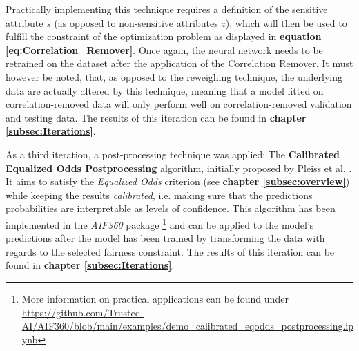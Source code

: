 Practically implementing this technique requires a definition of the sensitive attribute $s$ (as opposed to non-sensitive attributes $z$), which will then be used to fulfill the constraint of the optimization problem as displayed in \textbf{equation \ref{eq:Correlation_Remover}}. 
Once again, the neural network needs to be retrained on the dataset after the application of the Correlation Remover. It must however be noted, that, as opposed to the reweighing technique, the underlying data are actually altered by this technique, meaning that a model fitted on correlation-removed data will only perform well on correlation-removed validation and testing data. The results of this iteration can be found in \textbf{chapter \ref{subsec:Iterations}}.

As a third iteration, a post-processing technique was applied: The \textbf{Calibrated Equalized Odds Postprocessing} algorithm, initially proposed by Pleiss et al. \parencite{Pleiss2017}. It aims to satisfy the \textit{Equalized Odds} criterion (see \textbf{chapter \ref{subsec:overview}}) while keeping the results \textit{calibrated}, i.e. making sure that the predictions probabilities are interpretable as levels of confidence.
This algorithm has been implemented in the \textit{AIF360} package \footnote{More information on practical applications can be found under \url{https://github.com/Trusted-AI/AIF360/blob/main/examples/demo_calibrated_eqodds_postprocessing.ipynb}} and can be applied to the model's predictions after the model has been trained by transforming the data with regards to the selected fairness constraint. The results of this iteration can be found in \textbf{chapter \ref{subsec:Iterations}}. 

